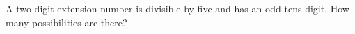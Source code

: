 A two-digit extension number is divisible by five and has an odd tens digit. How many possibilities are there?
